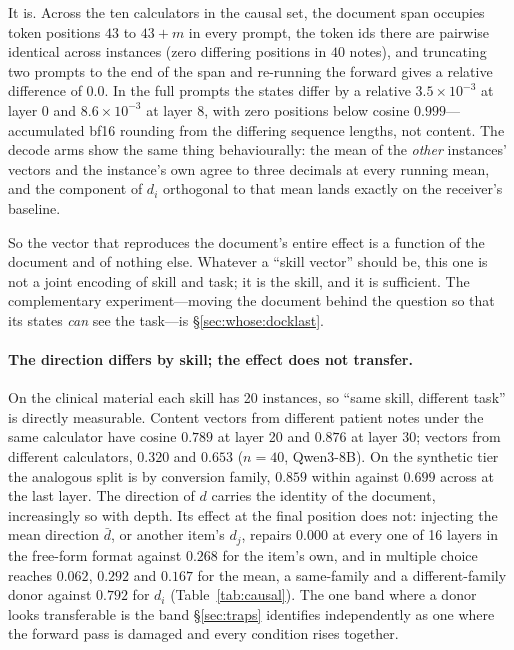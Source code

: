 \documentclass{article}
\newcommand{\dvec}{\ensuremath{d}}
\begin{document}
It is. Across the ten calculators in the causal set, the document span occupies
token positions $43$ to $43+m$ in every prompt, the token ids there are
pairwise identical across instances (zero differing positions in $40$ notes),
and truncating two prompts to the end of the span and re-running the forward
gives a relative difference of $0.0$. In the full prompts the states differ by a
relative $3.5\times10^{-3}$ at layer 0 and $8.6\times10^{-3}$ at layer 8, with
zero positions below cosine $0.999$---accumulated bf16 rounding from the
differing sequence lengths, not content. The decode arms show the same thing
behaviourally: the mean of the \emph{other} instances' vectors and the
instance's own agree to three decimals at every running mean, and the component
of $\dvec_i$ orthogonal to that mean lands exactly on the receiver's baseline.

So the vector that reproduces the document's entire effect is a function of the
document and of nothing else. Whatever a ``skill vector'' should be, this one is
not a joint encoding of skill and task; it is the skill, and it is sufficient.
The complementary experiment---moving the document behind the question so that
its states \emph{can} see the task---is \S\ref{sec:whose:docklast}.

\paragraph{The direction differs by skill; the effect does not transfer.}
On the clinical material each skill has 20 instances, so ``same skill, different
task'' is directly measurable. Content vectors from different patient notes under
the same calculator have cosine $0.789$ at layer 20 and $0.876$ at layer 30;
vectors from different calculators, $0.320$ and $0.653$ ($n=40$, Qwen3-8B). On
the synthetic tier the analogous split is by conversion family, $0.859$ within
against $0.699$ across at the last layer. The direction of $\dvec$ carries the
identity of the document, increasingly so with depth. Its effect at the final
position does not: injecting the mean direction $\bar{\dvec}$, or another item's
$\dvec_j$, repairs $0.000$ at every one of 16 layers in the free-form format
against $0.268$ for the item's own, and in multiple choice reaches $0.062$,
$0.292$ and $0.167$ for the mean, a same-family and a different-family donor
against $0.792$ for $\dvec_i$ (Table~\ref{tab:causal}). The one band where a
donor looks transferable is the band \S\ref{sec:traps} identifies independently
as one where the forward pass is damaged and every condition rises together.
\end{document}
